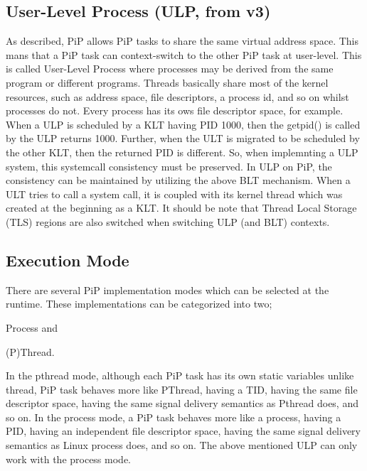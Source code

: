 \subsection*{User-\/\-Level Process (U\-L\-P, from v3)}

As described, Pi\-P allows Pi\-P tasks to share the same virtual address space. This mans that a Pi\-P task can context-\/switch to the other Pi\-P task at user-\/level. This is called User-\/\-Level Process where processes may be derived from the same program or different programs. Threads basically share most of the kernel resources, such as address space, file descriptors, a process id, and so on whilst processes do not. Every process has its ows file descriptor space, for example. When a U\-L\-P is scheduled by a K\-L\-T having P\-I\-D 1000, then the getpid() is called by the U\-L\-P returns 1000. Further, when the U\-L\-T is migrated to be scheduled by the other K\-L\-T, then the returned P\-I\-D is different. So, when implemnting a U\-L\-P system, this systemcall consistency must be preserved. In U\-L\-P on Pi\-P, the consistency can be maintained by utilizing the above B\-L\-T mechanism. When a U\-L\-T tries to call a system call, it is coupled with its kernel thread which was created at the beginning as a K\-L\-T. It should be note that Thread Local Storage (T\-L\-S) regions are also switched when switching U\-L\-P (and B\-L\-T) contexts.

\subsection*{Execution Mode}

There are several Pi\-P implementation modes which can be selected at the runtime. These implementations can be categorized into two;


\begin{DoxyItemize}
\item Process and
\item (P)Thread.
\end{DoxyItemize}

In the pthread mode, although each Pi\-P task has its own static variables unlike thread, Pi\-P task behaves more like P\-Thread, having a T\-I\-D, having the same file descriptor space, having the same signal delivery semantics as Pthread does, and so on. In the process mode, a Pi\-P task behaves more like a process, having a P\-I\-D, having an independent file descriptor space, having the same signal delivery semantics as Linux process does, and so on. The above mentioned U\-L\-P can only work with the process mode.

